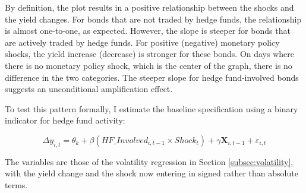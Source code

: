 \documentclass[english, 11pt, oneside]{article}
\begin{document}
By definition, the plot results in a positive relationship between the shocks and the yield changes. For bonds that are not traded by hedge funds, the relationship is almost one-to-one, as expected. However, the slope is steeper for bonds that are actively traded by hedge funds. For positive (negative) monetary policy shocks, the yield increase (decrease) is stronger for these bonds. On days where there is no monetary policy shock, which is the center of the graph, there is no difference in the two categories. The steeper slope for hedge fund-involved bonds suggests an unconditional amplification effect.

To test this pattern formally, I estimate the baseline specification using a binary indicator for hedge fund activity:

\begin{equation}
    \Delta y_{i,t} = \theta_{k} + \beta (HF\_Involved_{i,t-1} \times Shock_{t}) + \gamma \mathbf{X}_{i,t-1} + \varepsilon_{i,t}
\end{equation}

The variables are those of the volatility regression in Section \ref{subsec:volatility}, with the yield change and the shock now entering in signed rather than absolute terms.
\end{document}
